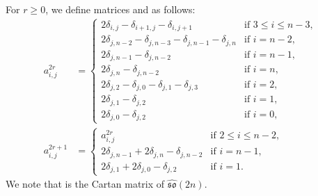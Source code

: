 \documentclass[pdftex]{sigma}
\numberwithin{equation}{section}
\theoremstyle{definition}
\begin{document}
For $r\geq0$, we define matrices  and  as follows:
\begin{align*}
a^{2r}_{i,j}&=\begin{cases}
2\delta_{i,j}-\delta_{i+1,j}-\delta_{i,j+1}&\text{if }3\leq i\leq n-3,\\
2\delta_{j,n-2}-\delta_{j,n-3}-\delta_{j,n-1}-\delta_{j,n}&\text{if }i=n-2,\\
2\delta_{j,n-1}-\delta_{j,n-2}&\text{if }i=n-1,\\
2\delta_{j,n}-\delta_{j,n-2}&\text{if }i=n,\\
2\delta_{j,2}-\delta_{j,0}-\delta_{j,1}-\delta_{j,3}&\text{if }i=2,\\
2\delta_{j,1}-\delta_{j,2}&\text{if }i=1,\\
2\delta_{j,0}-\delta_{j,2}&\text{if }i=0,
\end{cases}\\
a^{2r+1}_{i,j}&=\begin{cases}
a^{2r}_{i,j}&\text{if }2\leq i\leq n-2,\\
2\delta_{j,n-1}+2\delta_{j,n}-\delta_{j,n-2}&\text{if }i=n-1,\\
2\delta_{j,1}+2\delta_{j,0}-\delta_{j,2}&\text{if }i=1.
\end{cases}
\end{align*}
We note that  is the Cartan matrix of $\widehat{\mathfrak{so}}(2n)$.
\end{document}
